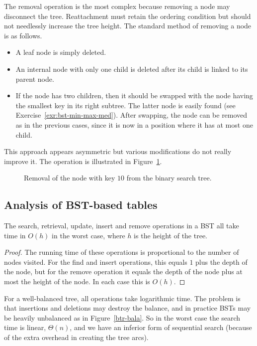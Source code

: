 The removal operation is the most complex because removing a node may
disconnect the tree. Reattachment must retain the ordering condition but
should not needlessly increase the tree height. The standard method of removing 
a node is as follows.
\begin{itemize}
\item A leaf node is simply deleted. 
\item An internal node with only one child
is deleted after its child is linked to its parent node.
\item If the node has two children, then it should be swapped with the node 
having the smallest key in its right subtree. 
The latter node is easily found (see Exercise~\ref{exr:bst-min-max-med}). After 
swapping, the node can be removed as in the previous cases, since it is now in 
a position where it has at most one child. 
\end{itemize}

This approach appears asymmetric but various modifications do not really
improve it. The operation is illustrated in Figure~\ref{btr-dele}.

\begin{figure}[htb!]
\centerline{
}
\caption{\label{btr-dele} Removal of the node with key $10$ from
the binary search tree.}
\end{figure}

\subsection{Analysis of BST-based tables}

\begin{Lemma}
The search, retrieval, update, insert and remove operations in a BST 
all take time in $O(h)$ in the worst case, where $h$ is the height of the tree. 
\end{Lemma}
\begin{proof}
The running time of these operations is proportional to the 
number of nodes visited. For the find and insert operations, this equals 
$1$ plus the depth of the node, but for the remove operation it equals the 
depth of the node plus at most the height of the node. In each case this is 
$O(h)$. 
\end{proof}

For a well-balanced tree, all operations take logarithmic time. The problem is 
that insertions and deletions may destroy the balance, and in practice BSTs 
may be heavily unbalanced as in Figure~\ref{btr-bala}. So in the worst case the 
search time is linear, $\Theta(n)$, and we have an inferior form of sequential search 
(because of the extra overhead in creating the tree arcs).

